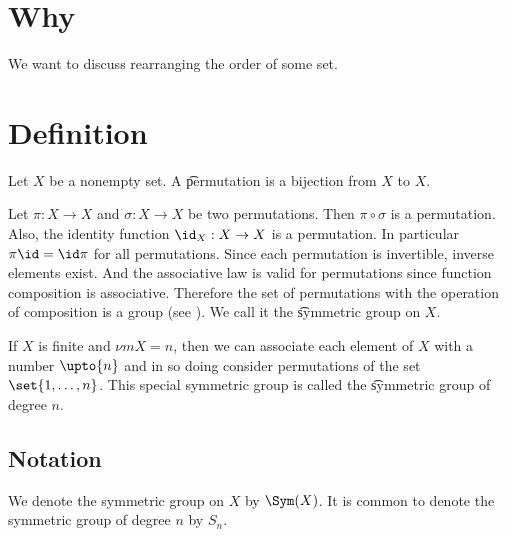 

\section*{Why}

We want to discuss rearranging the order of some set.

\section*{Definition}

Let $X$ be a nonempty set.
A \t{permutation} is a bijection from $X$ to $X$.

Let $\pi : X \to X$ and $\sigma : X \to X$ be two permutations.
Then $\pi  \circ \sigma $ is a permutation.
Also, the identity function $\id_{X}: X \to X$ is a permutation.
In particular $\pi \id = \id\pi $ for all permutations.
Since each permutation is invertible, inverse elements exist.
And the associative law is valid for permutations since function composition is associative.
Therefore the set of permutations with the operation of composition is a group (see ).
We call it the \t{symmetric group on $X$}.

If $X$ is finite and $\nu m{X} = n$, then we can associate each element of $X$ with a number $\upto{n}$ and in so doing consider permutations of the set $\set{1, \dots , n}$.
This special symmetric group is called the \t{symmetric group of degree $n$}.

\subsection*{Notation}

We denote the symmetric group on $X$ by $\Sym(X)$.
It is common to denote the symmetric group of degree $n$ by $S_n$.

\blankpage